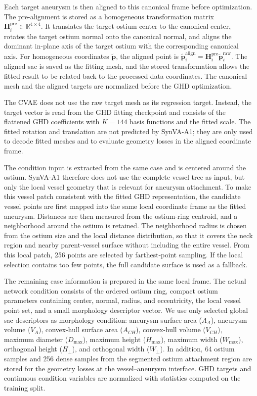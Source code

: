 Each target aneurysm is then aligned to this canonical frame before
optimization. The pre-alignment is stored as a homogeneous transformation
matrix $\bm{H}_{i}^{\mathrm{pre}}\in\mathbb{R}^{4\times4}$. It translates the
target ostium center to the canonical center, rotates the target ostium normal
onto the canonical normal, and aligns the dominant in-plane axis of the target
ostium with the corresponding canonical axis. For homogeneous coordinates
$\tilde{\bm{p}}$, the aligned point is
$\tilde{\bm{p}}_{i}^{\mathrm{align}}=\bm{H}_{i}^{\mathrm{pre}}\tilde{\bm{p}}_{i}^{\mathrm{raw}}$.
The aligned sac is saved as the fitting mesh, and the stored transformation
allows the fitted result to be related back to the processed data coordinates.
The canonical mesh and the aligned targets are normalized before the GHD
optimization.

The CVAE does not use the raw target mesh as its regression target. Instead,
the target vector is read from the GHD fitting checkpoint and consists of the
flattened GHD coefficients with $K=144$ basis functions and the fitted scale.
The fitted rotation and translation are not predicted by SynVA-A1; they are
only used to decode fitted meshes and to evaluate geometry losses in the
aligned coordinate frame.

The condition input is extracted from the same case and is centered around the
ostium. SynVA-A1 therefore does not use the complete vessel tree as input, but
only the local vessel geometry that is relevant for aneurysm attachment. To
make this vessel patch consistent with the fitted GHD representation, the
candidate vessel points are first mapped into the same local coordinate frame
as the fitted aneurysm. Distances are then measured from the ostium-ring
centroid, and a neighborhood around the ostium is retained. The neighborhood
radius is chosen from the ostium size and the local distance distribution, so
that it covers the neck region and nearby parent-vessel surface without
including the entire vessel. From this local patch, 256 points are selected by
farthest-point sampling. If the local selection contains too few points, the
full candidate surface is used as a fallback.

The remaining case information is prepared in the same local frame. The actual
network condition consists of the ordered ostium ring, compact ostium
parameters containing center, normal, radius, and eccentricity, the local
vessel point set, and a small morphology descriptor vector. We use only
selected global sac descriptors as morphology condition: aneurysm surface area
($A_A$), aneurysm volume ($V_A$), convex-hull surface area ($A_{CH}$),
convex-hull volume ($V_{CH}$), maximum diameter ($D_{\max}$), maximum height
($H_{\max}$), maximum width ($W_{\max}$), orthogonal height ($H_{\perp}$), and
orthogonal width ($W_{\perp}$). In addition, 64 ostium samples and 256 dense
samples from the segmented ostium attachment region are stored for the
geometry losses at the vessel--aneurysm interface. GHD targets and continuous
condition variables are normalized with statistics computed on the training
split.

